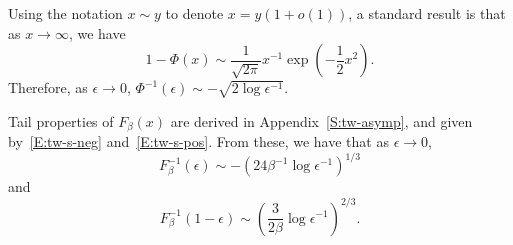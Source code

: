 \documentclass[final]{IEEEtran} %
\begin{document}
Using the notation $x \sim y$ to denote $x = y\left( 1 + o(1) \right)$, a
standard result \cite{abramowitz1970hmf} is that as $x \to \infty$, we have
\[
    1 - \Phi(x)
    \sim
    \frac{1}{\sqrt{2 \pi}}
    x^{-1}
    \exp\left( -\frac{1}{2} x^2 \right).
\]
Therefore, as $\epsilon \to 0$,
\(
    \Phi^{-1} (\epsilon)
    \sim
    -
    \sqrt{ 2 \log \epsilon^{-1} }
\).

Tail properties of $F_\beta(x)$ are derived in Appendix~\ref{S:tw-asymp}, and given by~\eqref{E:tw-s-neg} and~\eqref{E:tw-s-pos}.  From these, we have that as $\epsilon \to 0$,
\[
    F_\beta^{-1} ( \epsilon )
    \sim
    -
    \left( 24 \beta^{-1} \log \epsilon^{-1} \right)^{1/3}
\]
and
\[
    F_\beta^{-1} ( 1 - \epsilon )
    \sim
    \left(
        \frac{3}{2 \beta}
        \log \epsilon^{-1}
    \right)^{2/3}.
\]
\end{document}
